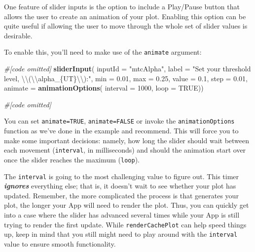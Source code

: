 \documentclass[
]{book}
\newenvironment{Shaded}{\begin{snugshade}}{\end{snugshade}}
\newcommand{\CharTok}[1]{\textcolor[rgb]{0.31,0.60,0.02}{#1}}
\newcommand{\CommentTok}[1]{\textcolor[rgb]{0.56,0.35,0.01}{\textit{#1}}}
\newcommand{\DataTypeTok}[1]{\textcolor[rgb]{0.13,0.29,0.53}{#1}}
\newcommand{\DecValTok}[1]{\textcolor[rgb]{0.00,0.00,0.81}{#1}}
\newcommand{\FloatTok}[1]{\textcolor[rgb]{0.00,0.00,0.81}{#1}}
\newcommand{\KeywordTok}[1]{\textcolor[rgb]{0.13,0.29,0.53}{\textbf{#1}}}
\newcommand{\NormalTok}[1]{#1}
\newcommand{\OtherTok}[1]{\textcolor[rgb]{0.56,0.35,0.01}{#1}}
\newcommand{\StringTok}[1]{\textcolor[rgb]{0.31,0.60,0.02}{#1}}
\begin{document}
One feature of slider inputs is the option to include a Play/Pause button that allows the user to create an animation of your plot. Enabling this option can be quite useful if allowing the user to move through the whole set of slider values is desirable.

To enable this, you'll need to make use of the \texttt{animate} argument:

\begin{Shaded}
\begin{Highlighting}[]
\CommentTok{#[code omitted]}
\KeywordTok{sliderInput}\NormalTok{(}
  \DataTypeTok{inputId =} \StringTok{"mtcAlpha"}\NormalTok{,}
  \DataTypeTok{label =} \StringTok{"Set your threshold level, }\CharTok{\textbackslash{}\textbackslash{}}\StringTok{(}\CharTok{\textbackslash{}\textbackslash{}}\StringTok{alpha_\{UT\}}\CharTok{\textbackslash{}\textbackslash{}}\StringTok{):"}\NormalTok{,}
  \DataTypeTok{min =} \FloatTok{0.01}\NormalTok{,}
  \DataTypeTok{max =} \FloatTok{0.25}\NormalTok{,}
  \DataTypeTok{value =} \FloatTok{0.1}\NormalTok{,}
  \DataTypeTok{step =} \FloatTok{0.01}\NormalTok{,}
  \DataTypeTok{animate =} \KeywordTok{animationOptions}\NormalTok{(}
    \DataTypeTok{interval =} \DecValTok{1000}\NormalTok{, }\DataTypeTok{loop =} \OtherTok{TRUE}\NormalTok{))}

\CommentTok{#[code omitted]}
\end{Highlighting}
\end{Shaded}

You can set \texttt{animate=TRUE}, \texttt{animate=FALSE} or invoke the \texttt{animationOptions} function as we've done in the example and recommend. This will force you to make some important decisions: namely, how long the slider should wait between each movement (\texttt{interval}, in milliseconds) and should the animation start over once the slider reaches the maximum (\texttt{loop}).

The \texttt{interval} is going to the most challenging value to figure out. This timer \emph{\textbf{ignores}} everything else; that is, it doesn't wait to see whether your plot has updated. Remember, the more complicated the process is that generates your plot, the longer your App will need to render the plot. Thus, you can quickly get into a case where the slider has advanced several times while your App is still trying to render the first update. While \texttt{renderCachePlot} can help speed things up, keep in mind that you still might need to play around with the \texttt{interval} value to ensure smooth functionality.
\end{document}
